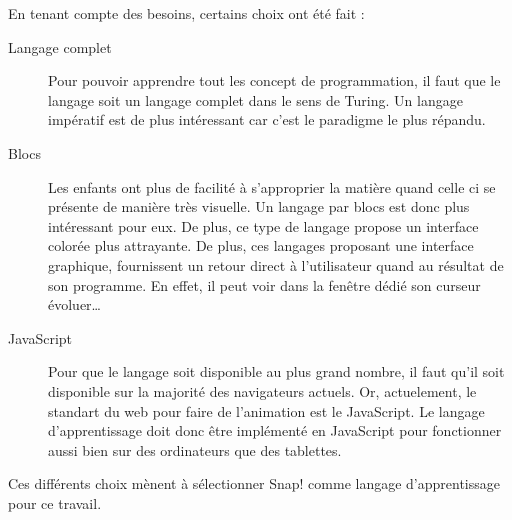 En tenant compte des besoins, certains choix ont été fait :
\begin{description}
  \item[Langage complet] Pour pouvoir apprendre tout les concept de programmation, il faut que le langage soit un langage complet dans le sens de Turing. Un langage impératif est de plus intéressant car c'est le paradigme le plus répandu.
  \item[Blocs] Les enfants ont plus de facilité à s'approprier la matière quand celle ci se présente de manière très visuelle. Un langage par blocs est donc plus intéressant pour eux. De plus, ce type de langage propose un interface colorée plus attrayante. De plus, ces langages proposant une interface graphique, fournissent un retour direct à l'utilisateur quand au résultat de son programme. En effet, il peut voir dans la fenêtre dédié son curseur évoluer\ldots %
  \item[JavaScript] Pour que le langage soit disponible au plus grand nombre, il faut qu'il soit disponible sur la majorité des navigateurs actuels. Or, actuelement, le standart du web pour faire de l'animation est le JavaScript. Le langage d'apprentissage doit donc être implémenté en JavaScript pour fonctionner aussi bien sur des ordinateurs que des tablettes.
\end{description}
Ces différents choix mènent à sélectionner Snap! comme langage d'apprentissage pour ce travail.


